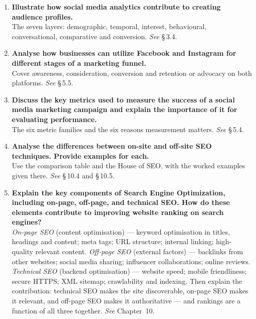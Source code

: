 \begin{enumerate}[leftmargin=2.2em,itemsep=1.4ex]
\item \textbf{Illustrate how social media analytics contribute to creating
      audience profiles.} \\
      The seven layers: demographic, temporal, interest, behavioural,
      conversational, comparative and conversion.
      \hfill\emph{See} \S\,3.4.

\item \textbf{Analyse how businesses can utilize Facebook and Instagram for
      different stages of a marketing funnel.}
      \\
      Cover awareness, consideration, conversion and retention or advocacy on
      both platforms. \hfill\emph{See} \S\,5.5.

\item \textbf{Discuss the key metrics used to measure the success of a social
      media marketing campaign and explain the importance of it for evaluating
      performance.} \\
      The six metric families and the six reasons measurement matters.
      \hfill\emph{See} \S\,5.4.

\item \textbf{Analyse the differences between on-site and off-site SEO
      techniques. Provide examples for each.}
      \\
      Use the comparison table and the House of SEO, with the worked examples
      given there. \hfill\emph{See} \S\,10.4 and \S\,10.5.

\item \textbf{Explain the key components of Search Engine Optimization,
      including on-page, off-page, and technical SEO. How do these elements
      contribute to improving website ranking on search engines?}
      \\
      \emph{On-page SEO} (content optimisation) --- keyword optimisation in
      titles, headings and content; meta tags; URL structure; internal linking;
      high-quality relevant content. \emph{Off-page SEO} (external factors) ---
      backlinks from other websites; social media sharing; influencer
      collaborations; online reviews. \emph{Technical SEO} (backend
      optimisation) --- website speed; mobile friendliness; secure HTTPS; XML
      sitemap; crawlability and indexing. Then explain the contribution:
      technical SEO makes the site discoverable, on-page SEO makes it relevant,
      and off-page SEO makes it authoritative --- and rankings are a function of
      all three together. \hfill\emph{See} Chapter~10.


\end{enumerate}
